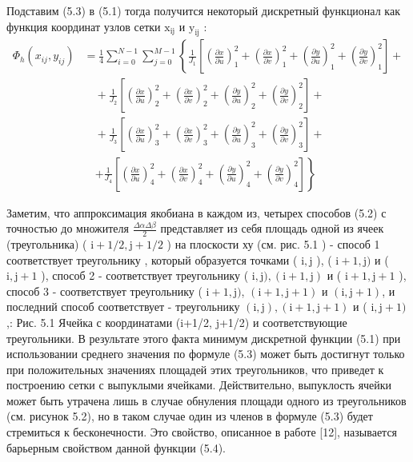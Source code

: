 \documentclass[a4paper,14pt,russian]{extreport}
\renewcommand{\_}{\kern-1.5pt\textunderscore\kern-1.5pt}
\begin{document}
Подставим (5.3) в (5.1) тогда получится некоторый дискретный функционал как функция координат узлов сетки $\mathrm{x}_{\mathrm{ij}}$ и $\mathrm{y}_{\mathrm{ij}}$ :
\begin{equation}
\begin{aligned}
\Phi_h\left(x_{i j}, y_{i j}\right) &= \frac{1}{4} \sum_{i=0}^{N-1} \sum_{j=0}^{M-1} \left\{ \frac{1}{J_1}\left[\left(\frac{\partial x}{\partial u}\right)_1^2 + \left(\frac{\partial x}{\partial v}\right)_1^2 + \left(\frac{\partial y}{\partial u}\right)_1^2 + \left(\frac{\partial y}{\partial v}\right)_1^2\right] + \right. \\
& \quad + \frac{1}{J_2}\left[\left(\frac{\partial x}{\partial u}\right)_2^2 + \left(\frac{\partial x}{\partial v}\right)_2^2 + \left(\frac{\partial y}{\partial u}\right)_2^2 + \left(\frac{\partial y}{\partial v}\right)_2^2\right] + \\
& \quad + \frac{1}{J_3}\left[\left(\frac{\partial x}{\partial u}\right)_3^2 + \left(\frac{\partial x}{\partial v}\right)_3^2 + \left(\frac{\partial y}{\partial u}\right)_3^2 + \left(\frac{\partial y}{\partial v}\right)_3^2\right] + \\
& \quad \left. + \frac{1}{J_4}\left[\left(\frac{\partial x}{\partial u}\right)_4^2 + \left(\frac{\partial x}{\partial v}\right)_4^2 + \left(\frac{\partial y}{\partial u}\right)_4^2 + \left(\frac{\partial y}{\partial v}\right)_4^2\right] \right\}
\end{aligned}
\end{equation}

Заметим, что аппроксимация якобиана в каждом из, четырех способов (5.2) с точностью до множителя $\frac{\Delta \alpha \Delta \beta}{2}$ представляет из себя площадь одной из ячеек (треугольника) ( $\mathrm{i}+1 / 2, \mathrm{j}+1 / 2$ ) на плоскости ху (см. рис. 5.1 ) - способ 1 соответствует треугольнику , который образуется точками ( $\mathrm{i}, \mathrm{j}$ ), ( $\mathrm{i}+1, \mathrm{j})$ и ( $\mathrm{i}, \mathrm{j}+1$ ), способ 2 - соответствует треугольнику ( $\mathrm{i}, \mathrm{j}),(\mathrm{i}+1, \mathrm{j})$ и ( $\mathrm{i}+1, \mathrm{j}+1$ ), способ 3 - соответствует треугольнику ( $\mathrm{i}+1, \mathrm{j})$, $(\mathrm{i}+1, \mathrm{j}+1)$ и $(\mathrm{i}, \mathrm{j}+1)$, и последний способ соответствует - треугольнику $(\mathrm{i}, \mathrm{j}),(\mathrm{i}+1, \mathrm{j}+1)$ и ( $\mathrm{i}, \mathrm{j}+1)$,:
Рис. 5.1
Ячейка с координатами (i+1/2, j+1/2) и соответствующие треугольники.
В результате этого факта минимум дискретной функции (5.1) при использовании среднего значения по формуле (5.3) может быть достигнут только при положительных значениях площадей этих треугольников, что приведет к построению сетки с выпуклыми ячейками. Действительно, выпуклость ячейки может быть утрачена лишь в случае обнуления площади одного из треугольников (см. рисунок 5.2), но в таком случае один из членов в формуле (5.3) будет стремиться к бесконечности. Это свойство, описанное в работе [12], называется барьерным свойством данной функции (5.4).
\end{document}
